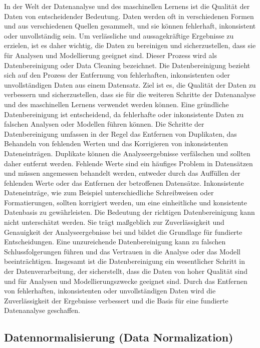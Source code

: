     In der Welt der Datenanalyse und des maschinellen Lernens ist die Qualität der Daten von entscheidender Bedeutung. 
    Daten werden oft in verschiedenen Formen und aus verschiedenen Quellen gesammelt, und sie können fehlerhaft, inkonsistent oder unvollständig sein. 
    Um verlässliche und aussagekräftige Ergebnisse zu erzielen, ist es daher wichtig, die Daten zu bereinigen und sicherzustellen, dass sie für Analysen und Modellierung geeignet sind. 
    Dieser Prozess wird als Datenbereinigung oder Data Cleaning bezeichnet.    
    Die Datenbereinigung bezieht sich auf den Prozess der Entfernung von fehlerhaften, inkonsistenten oder unvollständigen Daten aus einem Datensatz. 
    Ziel ist es, die Qualität der Daten zu verbessern und sicherzustellen, dass sie für die weiteren Schritte der Datenanalyse und des maschinellen Lernens verwendet werden können. 
    Eine gründliche Datenbereinigung ist entscheidend, da fehlerhafte oder inkonsistente Daten zu falschen Analysen oder Modellen führen können.    
    Die Schritte der Datenbereinigung umfassen in der Regel das Entfernen von Duplikaten, das Behandeln von fehlenden Werten und das Korrigieren von inkonsistenten Dateneinträgen. 
    Duplikate können die Analyseergebnisse verfälschen und sollten daher entfernt werden. 
    Fehlende Werte sind ein häufiges Problem in Datensätzen und müssen angemessen behandelt werden, entweder durch das Auffüllen der fehlenden Werte oder das Entfernen der betroffenen Datensätze. 
    Inkonsistente Dateneinträge, wie zum Beispiel unterschiedliche Schreibweisen oder Formatierungen, sollten korrigiert werden, um eine einheitliche und konsistente Datenbasis zu gewährleisten.  
    Die Bedeutung der richtigen Datenbereinigung kann nicht unterschätzt werden. 
    Sie trägt maßgeblich zur Zuverlässigkeit und Genauigkeit der Analyseergebnisse bei und bildet die Grundlage für fundierte Entscheidungen. 
    Eine unzureichende Datenbereinigung kann zu falschen Schlussfolgerungen führen und das Vertrauen in die Analyse oder das Modell beeinträchtigen.    
    Insgesamt ist die Datenbereinigung ein wesentlicher Schritt in der Datenverarbeitung, der sicherstellt, dass die Daten von hoher Qualität sind und für Analysen und Modellierungszwecke geeignet sind. 
    Durch das Entfernen von fehlerhaften, inkonsistenten oder unvollständigen Daten wird die Zuverlässigkeit der Ergebnisse verbessert und die Basis für eine fundierte Datenanalyse geschaffen.

\subsection{Datennormalisierung (Data Normalization)}

